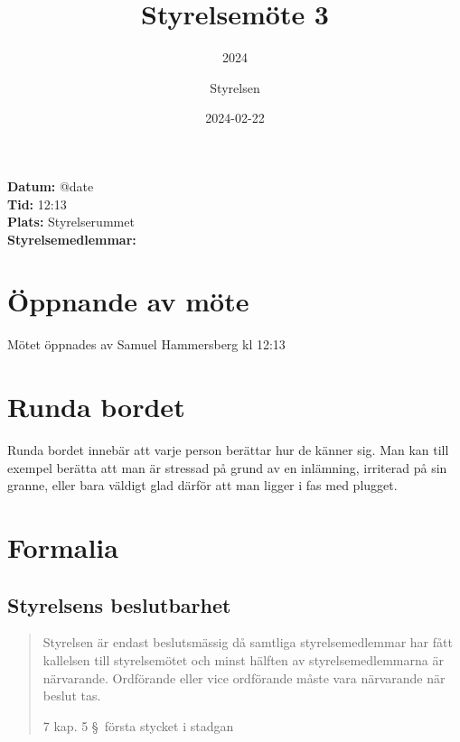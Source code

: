 \documentclass[protokoll]{dvd}
\begin{document}
\title{Styrelsemöte 3}
\subtitle{2024}
\author{Styrelsen}
\date{2024-02-22}


\textbf{Datum:} \csname @date\endcsname\\
\textbf{Tid:} 12:13\\
\textbf{Plats:} Styrelserummet\\
\textbf{Styrelsemedlemmar:}
\begin{närvarande_förtroendevalda}
\end{närvarande_förtroendevalda}

\begin{närvarande_medlemmar}
\end{närvarande_medlemmar}

\section{Öppnande av möte}

Mötet öppnades av Samuel Hammersberg kl 12:13

\section{Runda bordet}

Runda bordet innebär att varje person berättar hur de känner sig.
Man kan till exempel berätta att man är stressad på grund av en inlämning, irriterad på sin granne, eller bara väldigt glad därför att man ligger i fas med plugget.

\section{Formalia}

\subsection{Styrelsens beslutbarhet}

\blockquote[7 kap. 5 \S~första stycket i stadgan][]{%
    Styrelsen är endast beslutsmässig då samtliga styrelsemedlemmar har fått kallelsen till styrelsemötet och minst hälften av styrelsemedlemmarna är närvarande.
    Ordförande eller vice ordförande måste vara närvarande när beslut tas.
}
\end{document}
